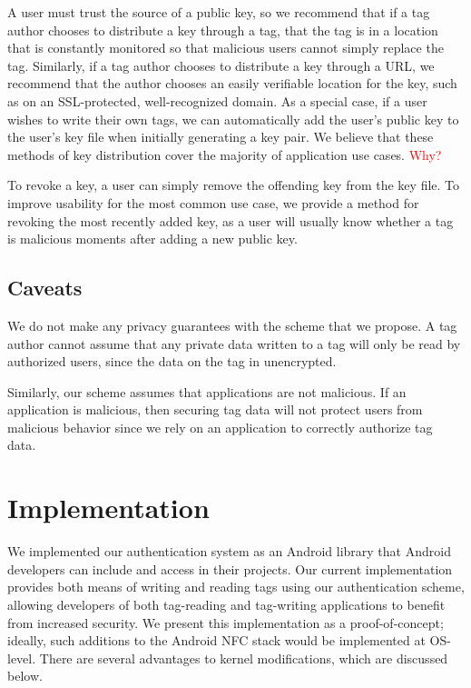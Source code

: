 \documentclass[12pt]{article}
\newcommand\TODO[1]{\textcolor{red}{#1}}
\begin{document}
A user must trust the source of a public key, so we recommend that if a tag author chooses to distribute a key through a tag, that the tag is in a location that is constantly monitored so that malicious users cannot simply replace the tag.
Similarly, if a tag author chooses to distribute a key through a URL, we recommend that the author chooses an easily verifiable location for the key, such as on an SSL-protected, well-recognized domain.
As a special case, if a user wishes to write their own tags, we can automatically add the user's public key to the user's key file when initially generating a key pair.  
We believe that these methods of key distribution cover the majority of application use cases. \TODO{Why?}

To revoke a key, a user can simply remove the offending key from the key file.
To improve usability for the most common use case, we provide a method for revoking the most recently added key, as a user will usually know whether a tag is malicious moments after adding a new public key.

\subsection{Caveats}

We do not make any privacy guarantees with the scheme that we propose.
A tag author cannot assume that any private data written to a tag will only be read by authorized users, since the data on the tag in unencrypted.

Similarly, our scheme assumes that applications are not malicious.
If an application is malicious, then securing tag data will not protect users from malicious behavior since we rely on an application to correctly authorize tag data.

\section{Implementation}
We implemented our authentication system as an Android library that Android developers can include and access in their projects.
Our current implementation provides both means of writing and reading tags using our authentication scheme, allowing developers of both tag-reading and tag-writing applications to benefit from increased security.
We present this implementation as a proof-of-concept; ideally, such additions to the Android NFC stack would be implemented at OS-level.
There are several advantages to kernel modifications, which are discussed below.
\end{document}
